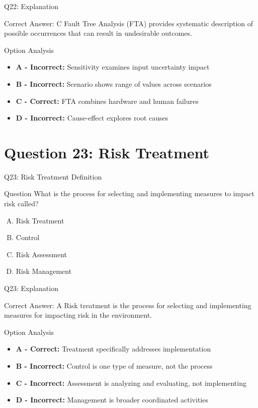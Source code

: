 \documentclass{beamer}
\begin{document}
	\begin{frame}{Q22: Explanation}
		\begin{block}{Correct Answer: C}
			Fault Tree Analysis (FTA) provides systematic description of possible occurrences that can result in undesirable outcomes.
		\end{block}
		\begin{block}{Option Analysis}
			\begin{itemize}
				\item \textbf{A - Incorrect:} Sensitivity examines input uncertainty impact
				\item \textbf{B - Incorrect:} Scenario shows range of values across scenarios
				\item \textbf{C - Correct:} FTA combines hardware and human failures
				\item \textbf{D - Incorrect:} Cause-effect explores root causes
			\end{itemize}
		\end{block}
	\end{frame}
	
	\section{Question 23: Risk Treatment}
	
	\begin{frame}{Q23: Risk Treatment Definition}
		\begin{block}{Question}
			What is the process for selecting and implementing measures to impact risk called?
		\end{block}
		\begin{enumerate}[(A)]
			\item Risk Treatment
			\item Control
			\item Risk Assessment
			\item Risk Management
		\end{enumerate}
	\end{frame}
	
	\begin{frame}{Q23: Explanation}
		\begin{block}{Correct Answer: A}
			Risk treatment is the process for selecting and implementing measures for impacting risk in the environment.
		\end{block}
		\begin{block}{Option Analysis}
			\begin{itemize}
				\item \textbf{A - Correct:} Treatment specifically addresses implementation
				\item \textbf{B - Incorrect:} Control is one type of measure, not the process
				\item \textbf{C - Incorrect:} Assessment is analyzing and evaluating, not implementing
				\item \textbf{D - Incorrect:} Management is broader coordinated activities
			\end{itemize}
		\end{block}
	\end{frame}
	
\end{document}
